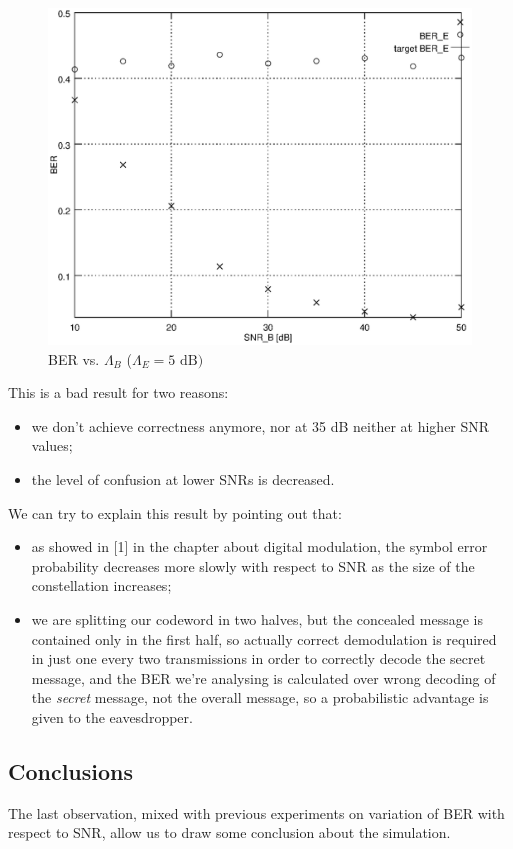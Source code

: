 \documentclass[a4paper,12pt,titlepage]{article}
\begin{document}
\begin{figure}[h]
  \centering
  \includegraphics[scale=0.8]{awgn_ber_8_15.eps}
  \caption{BER vs.
  $\Lambda_B$ ($\Lambda_E = 5 \text{ dB})$}
  \label{fig:awgn_ber_8_15}
\end{figure}

This is a bad result for two reasons:
\begin{itemize}
  \item we don't achieve correctness anymore, nor at 35 dB neither at higher
  SNR values;
  \item the level of confusion at lower SNRs is decreased.
\end{itemize}
We can try to explain this result by pointing out that:
\begin{itemize}
  \item as showed in [1] in the chapter about digital modulation, the symbol
  error probability decreases more slowly with respect to SNR as the
  size of the constellation increases;
  \item we are splitting our codeword in two halves, but the concealed message
  is contained only in the first half, so actually correct demodulation is
  required in just one every two transmissions in order to correctly decode the
  secret message, and the BER we're analysing is calculated over wrong decoding
  of the \emph{secret} message, not the overall message, so a probabilistic advantage is
  given to the eavesdropper.
\end{itemize}

\subsection*{Conclusions}
The last observation, mixed with previous experiments on variation of BER with
respect to SNR, allow us to draw some conclusion about the simulation.
\end{document}
